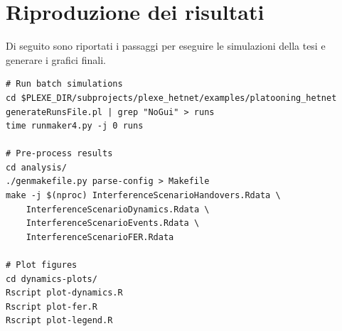 \section{Riproduzione dei risultati}

Di seguito sono riportati i passaggi per eseguire le simulazioni della tesi e generare i grafici finali.

\begin{lstlisting}[caption={Workflow bash per la riproduzione dei risultati},label={lst:campaign_workflow}]
# Run batch simulations
cd $PLEXE_DIR/subprojects/plexe_hetnet/examples/platooning_hetnet
generateRunsFile.pl | grep "NoGui" > runs
time runmaker4.py -j 0 runs

# Pre-process results
cd analysis/
./genmakefile.py parse-config > Makefile
make -j $(nproc) InterferenceScenarioHandovers.Rdata \
    InterferenceScenarioDynamics.Rdata \
    InterferenceScenarioEvents.Rdata \
    InterferenceScenarioFER.Rdata

# Plot figures
cd dynamics-plots/
Rscript plot-dynamics.R
Rscript plot-fer.R
Rscript plot-legend.R
\end{lstlisting}
